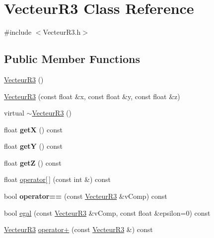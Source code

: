 \hypertarget{class_vecteur_r3}{}\section{Vecteur\+R3 Class Reference}
\label{class_vecteur_r3}


{\ttfamily \#include $<$Vecteur\+R3.\+h$>$}

\subsection*{Public Member Functions}
\begin{DoxyCompactItemize}
\item 
\mbox{\hyperlink{class_vecteur_r3_a265cb675642abf1db0fbd99eed4590e7}{Vecteur\+R3}} ()
\item 
\mbox{\hyperlink{class_vecteur_r3_a86df8062a0522098bac7c2f18e97f2a3}{Vecteur\+R3}} (const float \&x, const float \&y, const float \&z)
\item 
virtual \mbox{\hyperlink{class_vecteur_r3_a75a59c365109680a59e84db71faf8eb9}{$\sim$\+Vecteur\+R3}} ()
\item 
\mbox{\label{class_vecteur_r3_a715d8803e29c9c588f763ed2d7227f42}} 
float {\bfseries getX} () const
\item 
\mbox{\label{class_vecteur_r3_a5f019e331867afdb05cac782bb14e9e9}} 
float {\bfseries getY} () const
\item 
\mbox{\label{class_vecteur_r3_a144eb3201fcb8235f86ea56fbe60898f}} 
float {\bfseries getZ} () const
\item 
float \mbox{\hyperlink{class_vecteur_r3_afb4fb3f4cd023a67cb74e906117ca30c}{operator\mbox{[}$\,$\mbox{]}}} (const int \&) const
\item 
\mbox{\label{class_vecteur_r3_a0372c4411592d0a3adb4cf052e1b098d}} 
bool {\bfseries operator==} (const \mbox{\hyperlink{class_vecteur_r3}{Vecteur\+R3}} \&v\+Comp) const
\item 
bool \mbox{\hyperlink{class_vecteur_r3_a3e37c4a2e567844b4c32bede3f1b357e}{egal}} (const \mbox{\hyperlink{class_vecteur_r3}{Vecteur\+R3}} \&v\+Comp, const float \&epsilon=0) const
\item 
\mbox{\hyperlink{class_vecteur_r3}{Vecteur\+R3}} \mbox{\hyperlink{class_vecteur_r3_a00f29db8de9383f6627da7053c2c9af4}{operator+}} (const \mbox{\hyperlink{class_vecteur_r3}{Vecteur\+R3}} \&) const

\end{DoxyCompactItemize}
